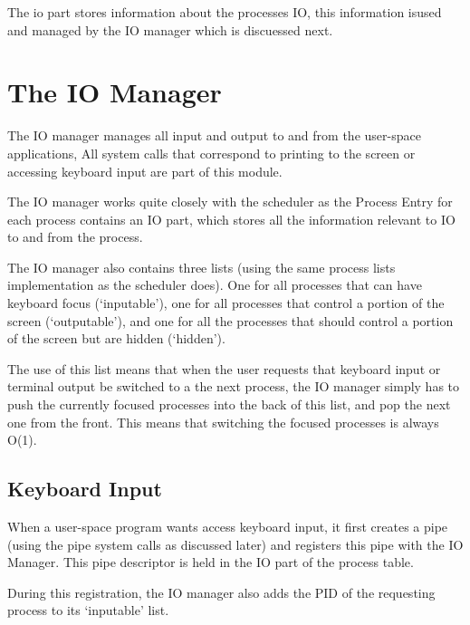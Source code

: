 \documentclass[a4paper]{report}
\begin{document}
The io part stores information about the processes IO, this information isused and managed by the IO manager which is discuessed next.


















\clearpage

\section{The IO Manager}

The IO manager manages all input and output to and from the user-space applications, All system calls that correspond to printing to the screen or accessing keyboard input are part of this module.

The IO manager works quite closely with the scheduler as the Process Entry for each process contains an IO part, which stores all the information relevant to IO to and from the process.

The IO manager also contains three lists (using the same process lists implementation as the scheduler does). One for all processes that can have keyboard focus (`inputable'), one for all processes that control a portion of the screen (`outputable'), and one for all the processes that should control a portion of the screen but are hidden (`hidden').

The use of this list means that when the user requests that keyboard input or terminal output be switched to a the next process, the IO manager simply has to push the currently focused processes into the back of this list, and pop the next one from the front. This means that switching the focused processes is always O(1).

\subsection{Keyboard Input}

When a user-space program wants access keyboard input, it first creates a pipe (using the pipe system calls as discussed later) and registers this pipe with the IO Manager. This pipe descriptor is held in the IO part of the process table.

During this registration, the IO manager also adds the PID of the requesting process to its `inputable' list.
\end{document}
